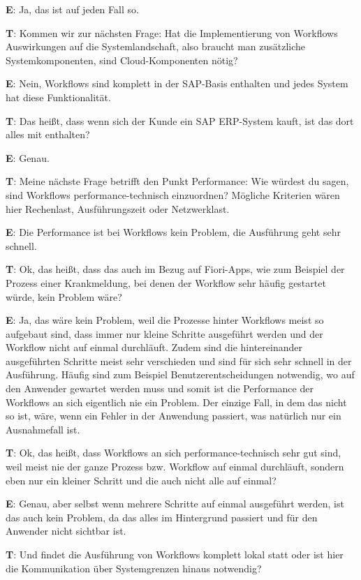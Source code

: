 \begin{list}{X:}{\setlength{\labelsep}{5mm}}
    \item[\textbf{E}:] Ja, das ist auf jeden Fall so.
    \item[\textbf{T}:] Kommen wir zur nächsten Frage: Hat die Implementierung von Workflows Auswirkungen auf die Systemlandschaft, also braucht man zusätzliche Systemkomponenten, sind Cloud-Komponenten nötig?
    \item[\textbf{E}:] Nein, Workflows sind komplett in der SAP-Basis enthalten und jedes System hat diese Funktionalität.
    \item[\textbf{T}:] Das hei{\ss}t, dass wenn sich der Kunde ein SAP ERP-System kauft, ist das dort alles mit enthalten?
    \item[\textbf{E}:] Genau.
    \item[\textbf{T}:] Meine nächste Frage betrifft den Punkt Performance: Wie würdest du sagen, sind Workflows performance-technisch einzuordnen? Mögliche Kriterien wären hier Rechenlast, Ausführungszeit oder Netzwerklast.
    \item[\textbf{E}:] Die Performance ist bei Workflows kein Problem, die Ausführung geht sehr schnell.
    \item[\textbf{T}:] Ok, das hei{\ss}t, dass das auch im Bezug auf Fiori-Apps, wie zum Beispiel der Prozess einer Krankmeldung, bei denen der Workflow sehr häufig gestartet würde, kein Problem wäre?
    \item[\textbf{E}:] Ja, das wäre kein Problem, weil die Prozesse hinter Workflows meist so aufgebaut sind, dass immer nur kleine Schritte ausgeführt werden und der Workflow nicht auf einmal durchläuft. Zudem sind die hintereinander ausgeführten Schritte meist sehr verschieden und sind für sich sehr schnell in der Ausführung. Häufig sind zum Beispiel Benutzerentscheidungen notwendig, wo auf den Anwender gewartet werden muss und somit ist die Performance der Workflows an sich eigentlich nie ein Problem. Der einzige Fall, in dem das nicht so ist, wäre, wenn ein Fehler in der Anwendung passiert, was natürlich nur ein Ausnahmefall ist.
    \item[\textbf{T}:] Ok, das hei{\ss}t, dass Workflows an sich performance-technisch sehr gut sind, weil meist nie der ganze Prozess bzw. Workflow auf einmal durchläuft, sondern eben nur ein kleiner Schritt und die auch nicht alle auf einmal?
    \item[\textbf{E}:] Genau, aber selbst wenn mehrere Schritte auf einmal ausgeführt werden, ist das auch kein Problem, da das alles im Hintergrund passiert und für den Anwender nicht sichtbar ist.
    \item[\textbf{T}:] Und findet die Ausführung von Workflows komplett lokal statt oder ist hier die Kommunikation über Systemgrenzen hinaus notwendig?

\end{list}

